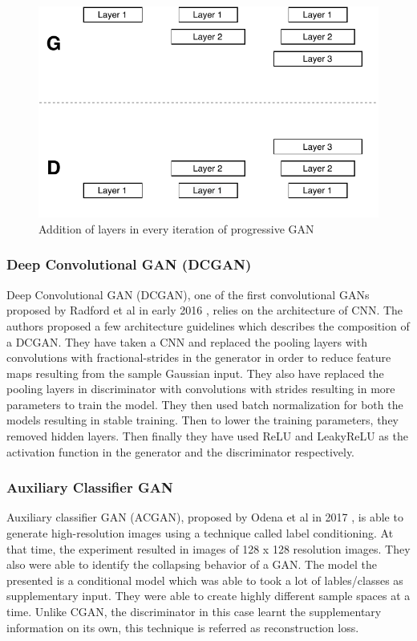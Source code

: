 \documentclass[conference]{IEEEtran}
\begin{document}
\begin{figure}[!h]
    \centerline{\includegraphics[scale=0.7]{figures/PGAN.pdf}}
    \caption{Addition of layers in every iteration of progressive GAN}
    \label{fig3}
\end{figure}

\subsubsection{Deep Convolutional GAN (DCGAN)}
Deep Convolutional GAN (DCGAN), one of the first convolutional GANs proposed by Radford et al in early 2016 \cite{b5}, relies on the architecture of CNN. The authors proposed a few architecture guidelines which describes the composition of a DCGAN. They have taken a CNN and replaced the pooling layers with convolutions with fractional-strides in the generator in order to reduce feature maps resulting from the sample Gaussian input. They also have replaced the pooling layers in discriminator with convolutions with strides resulting in more parameters to train the model. They then used batch normalization for both the models resulting in stable training. Then to lower the training parameters, they removed hidden layers. Then finally they have used ReLU and LeakyReLU as the activation function in the generator and the discriminator respectively. 

\subsubsection{Auxiliary Classifier GAN}
Auxiliary classifier GAN (ACGAN), proposed by Odena et al in 2017 \cite{b7}, is able to generate high-resolution images using a technique called label conditioning. At that time, the experiment resulted in images of 128 x 128 resolution images. They also were able to identify the collapsing behavior of a GAN. The model the presented is a conditional model which was able to took a lot of lables/classes as supplementary input. They were able to create highly different sample spaces at a time. Unlike CGAN, the discriminator in this case learnt the supplementary information on its own, this technique is referred as reconstruction loss. 
\end{document}
